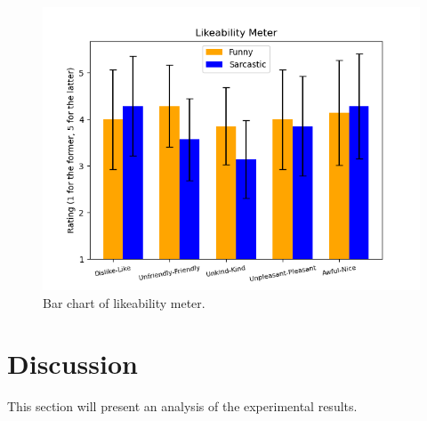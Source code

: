 \documentclass[conference]{IEEEtran}
\begin{document}
        \begin{figure}[htbp]
        \centering
        \includegraphics[width = \linewidth]{Pics/Likeability.png}
        \caption{Bar chart of likeability meter.}
        \label{fig:LikeabilityBar}
    \end{figure}


\section{Discussion}


This section will present an analysis of the experimental results.

\end{document}
